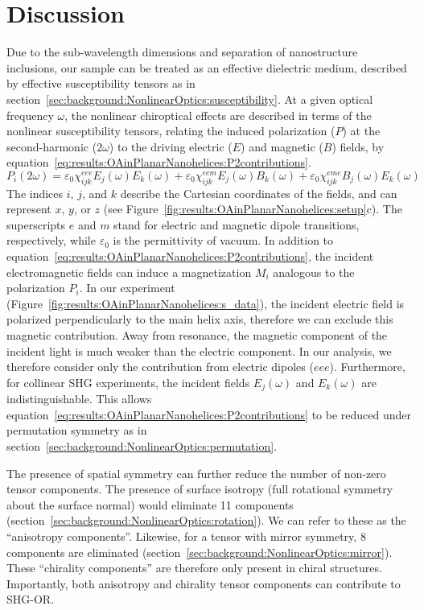 \section{Discussion}\label{sec:results:OAinPlanarNanohelices:discussion}
Due to the sub-wavelength dimensions and separation of nanostructure inclusions, our sample can be treated as an effective dielectric medium, described by effective susceptibility tensors as in section~\ref{sec:background:NonlinearOptics:susceptibility}.
At a given optical frequency $\omega$, the nonlinear chiroptical effects are described in terms of the nonlinear susceptibility tensors, relating the induced polarization ($P$) at the second-harmonic ($2\omega$) to the driving electric ($E$) and magnetic ($B$) fields, by equation~\ref{eq:results:OAinPlanarNanohelices:P2contributions}.\cite{Boyd2008a}
\begin{equation}\label{eq:results:OAinPlanarNanohelices:P2contributions}	
    {P_i}\left( {2\omega } \right) = 
    \varepsilon{_0}\chi_{ijk}^{eee}{E_j}\left(\omega \right){E_k}\left(\omega \right) + \varepsilon{_0}\chi_{ijk}^{eem}{E_j}\left(\omega \right){B_k}\left(\omega \right) + \varepsilon{_0}\chi_{ijk}^{eme}{B_j}\left(\omega \right){E_k}\left(\omega \right)
\end{equation}
The indices $i$, $j$, and $k$ describe the Cartesian coordinates of the fields, and can represent $x$, $y$, or $z$ (see Figure~\ref{fig:results:OAinPlanarNanohelices:setup}c). 
The superscripts $e$ and $m$ stand for electric and magnetic dipole transitions, respectively, while $\varepsilon{_0}$ is the permittivity of vacuum. 
In addition to equation~\ref{eq:results:OAinPlanarNanohelices:P2contributions}, the incident electromagnetic fields can induce a magnetization $M_i$ analogous to the polarization $P_i$. 
In our experiment (Figure~\ref{fig:results:OAinPlanarNanohelices:s_data}), the incident electric field is polarized perpendicularly to the main helix axis, therefore we can exclude this magnetic contribution. Away from resonance, the magnetic component of the incident light is much weaker than the electric component. 
In our analysis, we therefore consider only the contribution from electric dipoles ($eee$). Furthermore, for collinear SHG experiments, the incident fields ${E_j}(\omega)$ and ${E_k}(\omega)$ are indistinguishable. This allows equation~\ref{eq:results:OAinPlanarNanohelices:P2contributions} to be reduced under permutation symmetry as in section~\ref{sec:background:NonlinearOptics:permutation}.

The presence of spatial symmetry can further reduce the number of non-zero tensor components. The presence of surface isotropy (full rotational symmetry about the surface normal) would eliminate 11 components (section~\ref{sec:background:NonlinearOptics:rotation}). We can refer to these as the ``anisotropy components''. Likewise, for a tensor with mirror symmetry, 8 components are eliminated  (section~\ref{sec:background:NonlinearOptics:mirror}). These ``chirality components'' are therefore only present in chiral structures. Importantly, both anisotropy and chirality tensor components can contribute to SHG-OR. 

